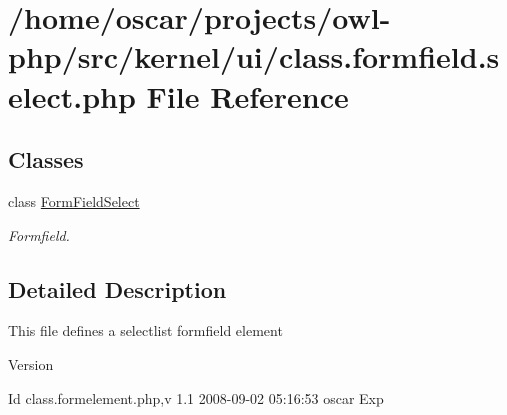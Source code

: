 \section{/home/oscar/projects/owl-\/php/src/kernel/ui/class.formfield.select.php File Reference}
\label{class_8formfield_8select_8php}
\subsection*{Classes}
\begin{DoxyCompactItemize}
\item 
class \hyperlink{classFormFieldSelect}{FormFieldSelect}
\begin{DoxyCompactList}\small\item\em Formfield. \item\end{DoxyCompactList}\end{DoxyCompactItemize}


\subsection{Detailed Description}
This file defines a selectlist formfield element \begin{DoxyVersion}{Version}

\end{DoxyVersion}
\begin{DoxyParagraph}{Id}
class.formelement.php,v 1.1 2008-\/09-\/02 05:16:53 oscar Exp 
\end{DoxyParagraph}
